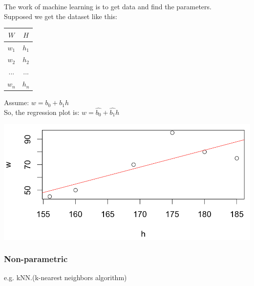 \documentclass{article}
\begin{document}
{{{{            The work of machine learning is to get data and find the parameters.\\

            Supposed we get the dataset like this:

            \begin{center}{
                \begin{tabular}{|c|c|}
                \hline
                $W$ & $H$ \\
                \hline
                $w_1$ & $h_1$ \\
                \hline
                $w_2$ & $h_2$ \\
                \hline
                ... & ... \\
                \hline
                $w_n$ & $h_n$ \\
                \hline
                \end{tabular}
            }
            \end{center} 

            Assume: $w = b_0 + b_1 h$\\
            So, the regression plot is: \(\hat{w}=\hat{b_0}+\hat{b_1} h\)


            \begin{center}{
                \includegraphics[scale=0.5]{regression.png}
            }
            \end{center}
        }
        \subsubsection{Non-parametric}{
            e.g. kNN.(k-nearest neighbors algorithm)\\

}}}}
\end{document}
